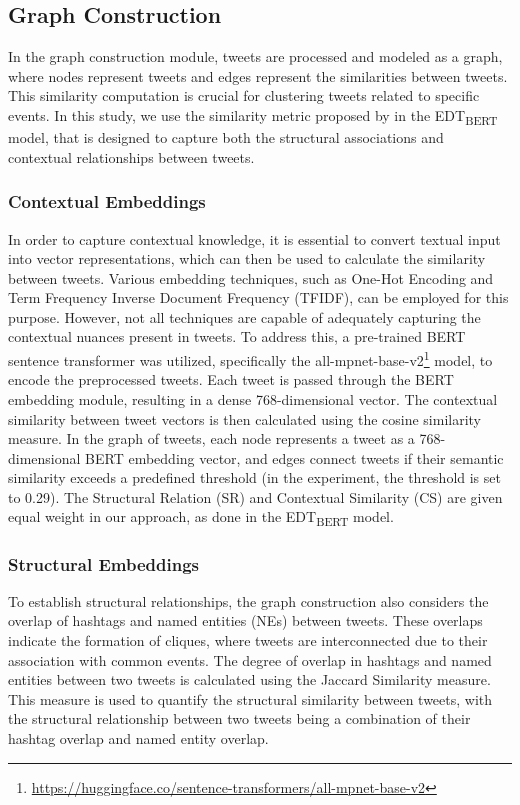 \subsection{Graph Construction}
\label{sec:graphconstruction}
In the graph construction module, tweets are processed and modeled as a graph, where nodes represent tweets and edges represent the similarities between tweets. This similarity computation is crucial for clustering tweets related to specific events. In this study, we use the similarity metric proposed by \citet{edtbert} in the EDT\textsubscript{BERT} model, that is designed to capture both the structural associations and contextual relationships between tweets.

\subsubsection{Contextual Embeddings}
\label{sec:contextualembeddings}
In order to capture contextual knowledge, it is essential to convert textual input into vector representations, which can then be used to calculate the similarity between tweets. Various embedding techniques, such as One-Hot Encoding and Term Frequency Inverse Document Frequency (TFIDF), can be employed for this purpose. However, not all techniques are capable of adequately capturing the contextual nuances present in tweets. To address this, a pre-trained BERT sentence transformer \citep{sentence-bert} was utilized, specifically the all-mpnet-base-v2\footnote{\url{https://huggingface.co/sentence-transformers/all-mpnet-base-v2}} model, to encode the preprocessed tweets. Each tweet is passed through the BERT embedding module, resulting in a dense 768-dimensional vector. The contextual similarity between tweet vectors is then calculated using the cosine similarity measure. In the graph of tweets, each node represents a tweet as a 768-dimensional BERT embedding vector, and edges connect tweets if their semantic similarity exceeds a predefined threshold (in the experiment, the threshold is set to 0.29). The Structural Relation (SR) and Contextual Similarity (CS) are given equal weight in our approach, as done in the EDT\textsubscript{BERT} model.


\subsubsection{Structural Embeddings}
\label{sec:structuralembeddings}
To establish structural relationships, the graph construction also considers the overlap of hashtags and named entities (NEs) between tweets. These overlaps indicate the formation of cliques, where tweets are interconnected due to their association with common events. The degree of overlap in hashtags and named entities between two tweets is calculated using the Jaccard Similarity measure. This measure is used to quantify the structural similarity between tweets, with the structural relationship between two tweets being a combination of their hashtag overlap and named entity overlap.

